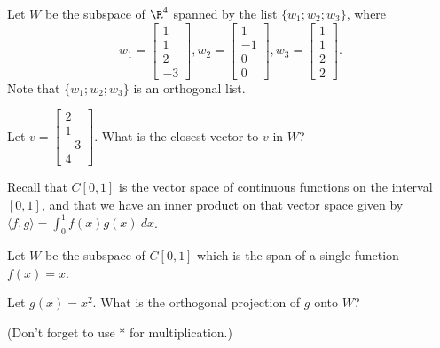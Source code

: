 

Let $W$ be the subspace of $\R^4$ spanned by the list $\{w_1; w_2; w_3\}$, where 
\[ w_1 = \left[\begin{array}{c} 1 \\ 1 \\ 2 \\ -3 
\end{array} \right], w_2 = \left[\begin{array}{c} 1 \\ -1 \\ 0 \\ 0 
\end{array} \right], w_3 = \left[\begin{array}{c} 1 \\ 1 \\ 2 \\ 2 
\end{array} \right]. \]  
Note that $\{w_1; w_2; w_3\}$ is an orthogonal list.  

Let $v = \left[\begin{array}{c} 2 \\ 1 \\ -3 \\ 4 
\end{array} \right].$  What is the closest vector to $v$ in $W$?  





\edXsolution{ 
}

\endedxproblem



Recall that $C[0,1]$ is the vector space of continuous functions on the interval $[0,1]$, and that
we have an inner product on that vector space given by $\langle f, g \rangle = \int_0^1 f(x)g(x) \ dx$.  


Let $W$ be the subspace of $C[0,1]$ which is the span of a single function 
$f(x) = x$.  

Let $g(x) = x^2$.  What is the orthogonal projection of $g$ onto $W$?  

(Don't forget to use * for multiplication.)

\\


\edXsolution{ 
}

